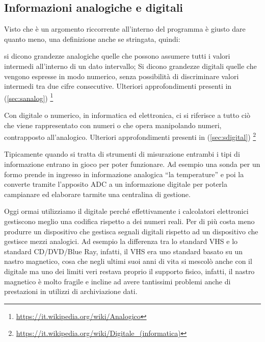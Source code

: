 \subsection{Informazioni analogiche e digitali}
\label{sec:andiginfo}
Visto che è un argomento riccorrente all'interno del programma è giusto dare quanto
meno, una definizione anche se stringata, quindi:
\begin{defi}
  \label{def:andef}
  si dicono grandezze analogiche quelle che possono assumere tutti i valori
  intermedi all'interno di un dato intervallo; Si dicono grandezze digitali
  quelle che vengono espresse in modo numerico, senza possibilità di
  discriminare valori intermedi tra due cifre consecutive.
  Ulteriori approfondimenti presenti in (\ref{sec:sanalog})
  \footnote{\href{https://it.wikipedia.org/wiki/Analogico}{https://it.wikipedia.org/wiki/Analogico}}
\end{defi}
\begin{defi}
  \label{def:digdef}
  Con digitale o numerico, in informatica ed elettronica, ci si riferisce a tutto ciò che
  viene rappresentato con numeri o che opera manipolando numeri, contrapposto all'analogico. Ulteriori approfondimenti presenti in (\ref{sec:sdigital})
  \footnote{\href{https://it.wikipedia.org/wiki/Digitale_(informatica)}{https://it.wikipedia.org/wiki/Digitale\_(informatica)}}
\end{defi}
\begin{oss}
  \label{oss:strumMisura}
  Tipicamente quando si tratta di strumenti di misurazione entrambi i tipi di
  informazione entrano in gioco per poter funzionare. Ad esempio una sonda per
  un formo prende in ingresso in informazione analogica ``la temperature'' e poi
  la converte tramite l'apposito ADC a un informazione digitale per poterla
  campianare ed elaborare tarmite una centralina di gestione. 
\end{oss}
Oggi ormai utilizziamo il digitale perché effettivamente i calcolatori
elettronici gestiscono meglio una codifica rispetto a dei numeri reali. Per di
più costa meno produrre un dispositivo che gestisca segnali digitali rispetto
ad un dispositivo che gestisce mezzi analogici.
Ad esempio la differenza tra lo standard VHS e lo standard CD/DVD/Blue Ray, infatti,
il VHS era uno standard basato su un nastro magnetico, cosa che negli ultimi suoi anni
di vita si mescolò anche con il digitale ma uno dei limiti veri restava proprio il
supporto fisico, infatti, il nastro magnetico è molto fragile e incline ad avere
tantissimi problemi anche di prestazioni in utilizzi di archiviazione dati.
